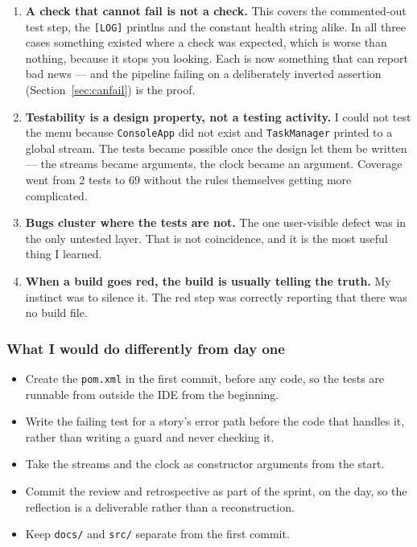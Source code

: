 \documentclass[11pt,a4paper]{article}
\newcommand{\code}[1]{\texttt{\small #1}}
\begin{document}
\begin{enumerate}
  \item \textbf{A check that cannot fail is not a check.} This covers the
        commented-out test step, the \code{[LOG]} printlns and the constant
        health string alike. In all three cases something existed where a check
        was expected, which is worse than nothing, because it stops you looking.
        Each is now something that can report bad news --- and the pipeline
        failing on a deliberately inverted assertion
        (Section~\ref{sec:canfail}) is the proof.
  \item \textbf{Testability is a design property, not a testing activity.} I
        could not test the menu because \code{ConsoleApp} did not exist and
        \code{TaskManager} printed to a global stream. The tests became possible
        once the design let them be written --- the streams became arguments,
        the clock became an argument. Coverage went from 2 tests to 69 without
        the rules themselves getting more complicated.
  \item \textbf{Bugs cluster where the tests are not.} The one user-visible
        defect was in the only untested layer. That is not coincidence, and it
        is the most useful thing I learned.
  \item \textbf{When a build goes red, the build is usually telling the truth.}
        My instinct was to silence it. The red step was correctly reporting that
        there was no build file.
\end{enumerate}

\subsubsection*{What I would do differently from day one}
\begin{itemize}
  \item Create the \code{pom.xml} in the first commit, before any code, so the
        tests are runnable from outside the IDE from the beginning.
  \item Write the failing test for a story's error path before the code that
        handles it, rather than writing a guard and never checking it.
  \item Take the streams and the clock as constructor arguments from the start.
  \item Commit the review and retrospective as part of the sprint, on the day,
        so the reflection is a deliverable rather than a reconstruction.
  \item Keep \code{docs/} and \code{src/} separate from the first commit.
\end{itemize}
\end{document}
